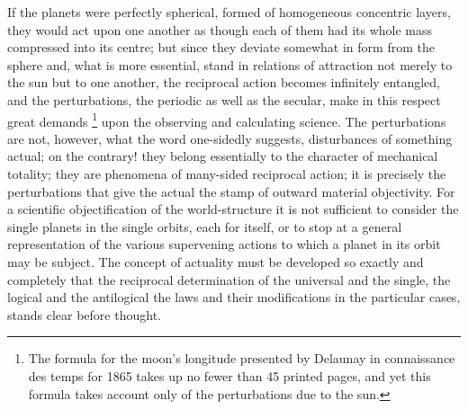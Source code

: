 \documentclass[12pt,a4paper]{book}
\renewcommand{\thefootnote}{*)}
\begin{document}
If the planets were perfectly spherical, formed of homogeneous concentric layers, they would act upon
one another as though each of them had its whole mass compressed into its centre; but since they deviate
somewhat in form from the sphere and, what is more essential, stand in relations of attraction not merely
to the sun but to one another, the reciprocal action becomes infinitely entangled, and the perturbations,
the periodic as well as the secular, make in this respect great demands%
\renewcommand{\thefootnote}{**)}%
\footnote{%
The formula for the moon's longitude presented by Delaunay in connaissance des temps for 1865 takes up no
fewer than 45 printed pages, and yet this formula takes account only of the perturbations due to the sun.}%
\renewcommand{\thefootnote}{*)}
upon the observing
and calculating science. The perturbations are not, however, what the word one-sidedly suggests,
disturbances of something actual; on the contrary! they belong essentially to the character of mechanical
totality; they are phenomena of many-sided reciprocal action; it is precisely the perturbations that give
the actual the stamp of outward material objectivity. For a scientific objectification of the
world-structure it is not sufficient to consider the single planets in the single orbits, each for itself,
or to stop at a general representation of the various supervening actions to which a planet in its orbit
may be subject. The concept of actuality must be developed so exactly and completely that the reciprocal
determination of the universal and the single, the logical and the antilogical
the laws and their modifications in the particular cases, stands clear before thought.%
\end{document}
